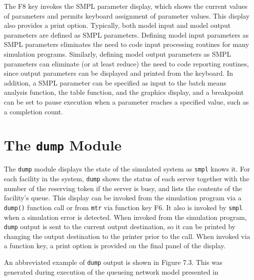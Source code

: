 The F8 key invokes the SMPL parameter display, which shows the
current values of parameters and permits keyboard assignment of parameter
values. This display also provides a print option. Typically, both model
input and model output parameters are defined as SMPL parameters. Defining
model input parameters as SMPL parameters eliminates the need to
code input processing routines for many simulation programs. Similarly,
defining model output parameters as SMPL parameters can eliminate (or at
least reduce) the need to code reporting routines, since output parameters can
be displayed and printed from the keyboard. In addition, a SMPL parameter
can be specified as input to the batch means analysis function, the table
function, and the graphics display, and a breakpoint can be set to pause
execution when a parameter reaches a specified value, such as a completion
count.

\section{The \texttt{dump} Module}
\label{sec:simenv-dump}

The \texttt{dump} module displays the state of the simulated system as \texttt{smpl}
knows it. For each facility in the system, \texttt{dump} shows the status of each
server together with the number of the reserving token if the server is busy,
and lists the contents of the facility's queue. This display can be invoked
from the simulation program via a \texttt{dump()} function call or from \texttt{mtr} via
function key F6. It also is invoked by \texttt{smpl} when a simulation error is
detected. When invoked from the simulation program, \texttt{dump} output is sent to
the current output destination, so it can be printed by changing the output
destination to the printer prior to the call. When invoked via a function
key, a print option is provided on the final panel of the display.

An abbreviated example of \texttt{dump} output is shown in Figure 7.3. This was
generated during execution of the queueing network model presented in

